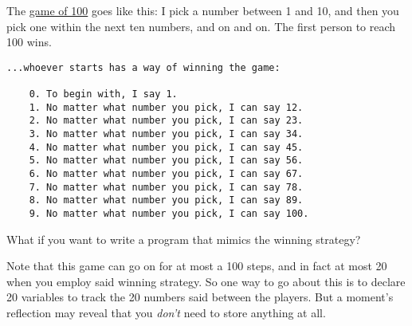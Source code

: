 \documentclass[
  letterpaper,
  DIV=11,
  numbers=noendperiod]{scrreprt}
\begin{document}
The \href{https://www.youtube.com/watch?v=846A4rgO_os}{game of 100} goes
like this: I pick a number between 1 and 10, and then you pick one
within the next ten numbers, and on and on. The first person to reach
100 wins.

\begin{tcolorbox}[standard jigsaw,titlerule=0mm, leftrule=.75mm, colbacktitle=quarto-callout-note-color!10!white, toptitle=1mm, toprule=.15mm, colframe=quarto-callout-note-color-frame, colback=white, coltitle=black, title=\textcolor{quarto-callout-note-color}{\faInfo}\hspace{0.5em}{Recall from class and/or figure out that\ldots{}}, bottomrule=.15mm, rightrule=.15mm, bottomtitle=1mm, left=2mm, opacitybacktitle=0.6, arc=.35mm, opacityback=0]

\begin{tcolorbox}[standard jigsaw,titlerule=0mm, leftrule=.75mm, colbacktitle=quarto-callout-warning-color!10!white, toptitle=1mm, toprule=.15mm, colframe=quarto-callout-warning-color-frame, colback=white, coltitle=black, title=\textcolor{quarto-callout-warning-color}{\faExclamationTriangle}\hspace{0.5em}{SPOILER ALERT}, bottomrule=.15mm, rightrule=.15mm, bottomtitle=1mm, left=2mm, opacitybacktitle=0.6, arc=.35mm, opacityback=0]

\begin{verbatim}
...whoever starts has a way of winning the game:

    0. To begin with, I say 1. 
    1. No matter what number you pick, I can say 12.
    2. No matter what number you pick, I can say 23.
    3. No matter what number you pick, I can say 34.
    4. No matter what number you pick, I can say 45.
    5. No matter what number you pick, I can say 56.
    6. No matter what number you pick, I can say 67.
    7. No matter what number you pick, I can say 78.
    8. No matter what number you pick, I can say 89.
    9. No matter what number you pick, I can say 100.
\end{verbatim}

\end{tcolorbox}

\end{tcolorbox}

What if you want to write a program that mimics the winning strategy?

Note that this game can go on for at most a 100 steps, and in fact at
most 20 when you employ said winning strategy. So one way to go about
this is to declare 20 variables to track the 20 numbers said between the
players. But a moment's reflection may reveal that you \emph{don't} need
to store anything at all.
\end{document}
